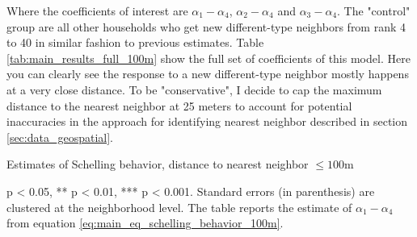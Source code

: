 \documentclass[../main.tex]{subfiles}
\begin{document}
Where the coefficients of interest are $\alpha_1-\alpha_4$, $\alpha_2-\alpha_4$ and $\alpha_3-\alpha_4$. The "control" group are all other households who get new different-type neighbors from rank 4 to 40 in similar fashion to previous estimates. Table \ref{tab:main_results_full_100m} show the full set of coefficients of this model. Here you can clearly see the response to a new different-type neighbor mostly happens at a very close distance. To be "conservative", I decide to cap the maximum distance to the nearest neighbor at 25 meters to account for potential inaccuracies in the approach for identifying nearest neighbor described in section \ref{sec:data_geospatial}.   

\begin{table}[H]
    \centering
    \caption{Estimates of Schelling behavior, distance to nearest neighbor $\leq100$m }
    \label{tab:main_results_full_100m}
    \begin{threeparttable}
            
    \begin{tablenotes}[flushleft]
    \item \scriptsize * p < 0.05, ** p < 0.01, *** p < 0.001. Standard errors (in parenthesis) are clustered at the neighborhood level. The table reports the estimate of $\alpha_1 - \alpha_4$ from equation \ref{eq:main_eq_schelling_behavior_100m}. 
    \end{tablenotes}
    \end{threeparttable}
\end{table}
\end{document}
